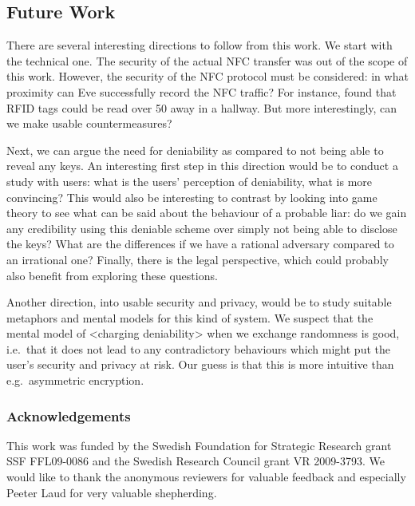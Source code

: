 \subsection{Future Work}

There are several interesting directions to follow from this work.
We start with the technical one.
The security of the actual \ac{NFC} transfer was out of the scope of this work.
However, the security of the \ac{NFC} protocol must be considered: in what 
proximity can Eve successfully record the \ac{NFC} traffic?
For instance, \citet{RFIDProximity} found that RFID tags could be read over 
\unit{50}{\metre} away in a hallway.
But more interestingly, can we make usable countermeasures?

Next, we can argue the need for deniability as compared to not being able to 
reveal any keys.
An interesting first step in this direction would be to conduct a study with 
users: what is the users' perception of deniability, what is more convincing?
This would also be interesting to contrast by looking into game theory to see 
what can be said about the behaviour of a probable liar: do we gain any 
credibility using this deniable scheme over simply not being able to disclose 
the keys?
What are the differences if we have a rational adversary compared to an 
irrational one?
Finally, there is the legal perspective, which could probably also benefit from 
exploring these questions.

Another direction, into usable security and privacy, would be to study suitable 
metaphors and mental models for this kind of system.
We suspect that the mental model of <charging deniability> when we exchange 
randomness is good, i.e.~that it does not lead to any contradictory behaviours 
which might put the user's security and privacy at risk.
Our guess is that this is more intuitive than e.g.~asymmetric encryption.


\subsubsection*{Acknowledgements}

This work was funded by the Swedish Foundation for Strategic Research grant SSF 
FFL09-0086 and the Swedish Research Council grant VR 2009-3793.
We would like to thank the anonymous reviewers for valuable feedback and 
especially Peeter Laud for very valuable shepherding.

